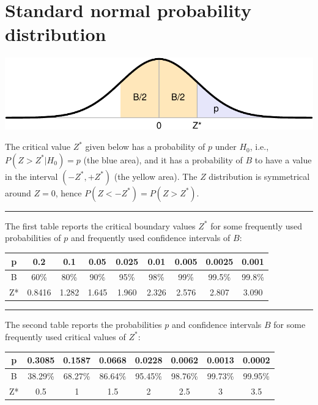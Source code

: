 \documentclass[
]{book}
\begin{document}
\hypertarget{app-criticalZvalues}{%
\chapter{Standard normal probability distribution}\label{app-criticalZvalues}}

\includegraphics{QMS-EN_files/figure-latex/kritiekeZwaarden-hulpfiguur-1.pdf}

The critical value \(Z^*\) given below has a probability of \(p\) under \(H_0\), i.e.,
\(P(Z > Z^*|H_0)=p\) (the blue area),
and it has a probability of \(B\) to have a value in the interval \((-Z^*, +Z^*)\) (the yellow area).
The \(Z\) distribution is symmetrical around \(Z=0\), hence \(P(Z < -Z^*) = P(Z > Z^*)\).

\begin{center}\rule{0.5\linewidth}{0.5pt}\end{center}

The first table reports the critical boundary values \(Z^*\) for some frequently used probabilities of \(p\) and frequently used confidence intervals of \(B\):

\begin{tabular}{ccccccccc}
\toprule
p & 0.2 & 0.1 & 0.05 & 0.025 & 0.01 & 0.005 & 0.0025 & 0.001\\
\midrule
B & 60\% & 80\% & 90\% & 95\% & 98\% & 99\% & 99.5\% & 99.8\%\\
Z* & 0.8416 & 1.282 & 1.645 & 1.960 & 2.326 & 2.576 & 2.807 & 3.090\\
\bottomrule
\end{tabular}

\begin{center}\rule{0.5\linewidth}{0.5pt}\end{center}

The second table reports the probabilities \(p\) and confidence intervals \(B\) for some frequently used critical values of \(Z^*\):

\begin{tabular}{cccccccc}
\toprule
p & 0.3085 & 0.1587 & 0.0668 & 0.0228 & 0.0062 & 0.0013 & 0.0002\\
\midrule
B & 38.29\% & 68.27\% & 86.64\% & 95.45\% & 98.76\% & 99.73\% & 99.95\%\\
Z* & 0.5 & 1 & 1.5 & 2 & 2.5 & 3 & 3.5\\
\bottomrule
\end{tabular}
\end{document}
